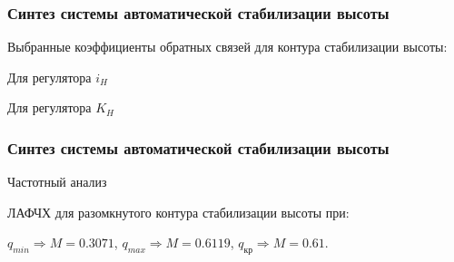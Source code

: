 \documentclass{beamer}
\begin{document}
\begin{frame}[t]
    \frametitle{Синтез системы автоматической стабилизации высоты}
\begin{center}
    Выбранные коэффициенты обратных связей для контура стабилизации высоты:
    \vspace{14pt}

    \begin{minipage}{0.49\textwidth}
        \begin{center}
            Для регулятора $i_H$\\
            \resizebox{\textwidth}{!}{}
        \end{center}
    \end{minipage}
    \hfill
    \begin{minipage}{0.49\textwidth}
        \begin{center}
            Для регулятора $K_H$\\
            \resizebox{\textwidth}{!}{}
        \end{center}
    \end{minipage}
\end{center}
\end{frame}

\begin{frame}[t]
    \frametitle{Синтез системы автоматической стабилизации высоты}
    \begin{center}
        Частотный анализ
    
        ЛАФЧХ для разомкнутого контура стабилизации высоты при: 

        $q_{min} \Rightarrow M = 0.3071$, $q_{max} \Rightarrow M = 0.6119$,
        $q_{кр} \Rightarrow M=0.61$.
        \resizebox{!}{0.7\textheight}{}
    \end{center}
\end{frame}
\end{document}
